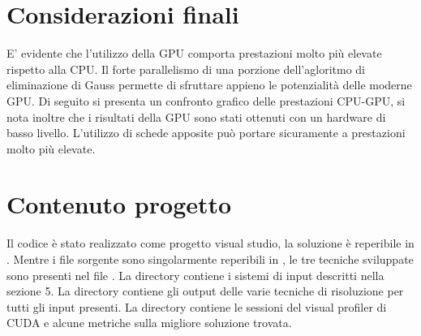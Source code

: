 \documentclass{article}
\begin{document}
\section{Considerazioni finali}
E' evidente che l'utilizzo della GPU comporta prestazioni molto più elevate rispetto alla CPU. Il forte parallelismo di una porzione dell'agloritmo di eliminazione di Gauss permette di sfruttare appieno le potenzialità delle moderne GPU. Di seguito si presenta un confronto grafico delle prestazioni CPU-GPU, si nota inoltre che i risultati della GPU sono stati ottenuti con un hardware di basso livello. L'utilizzo di schede apposite può portare sicuramente a prestazioni molto più elevate.


\section{Contenuto progetto}
Il codice è stato realizzato come progetto visual studio, la soluzione è reperibile in . Mentre i file sorgente sono singolarmente reperibili in , le tre tecniche sviluppate sono presenti nel file . La directory  contiene i sistemi di input descritti nella sezione 5. La directory  contiene gli output delle varie tecniche di risoluzione per tutti gli input presenti. La directory  contiene le sessioni del visual profiler di CUDA e alcune metriche sulla migliore soluzione trovata.
\end{document}
